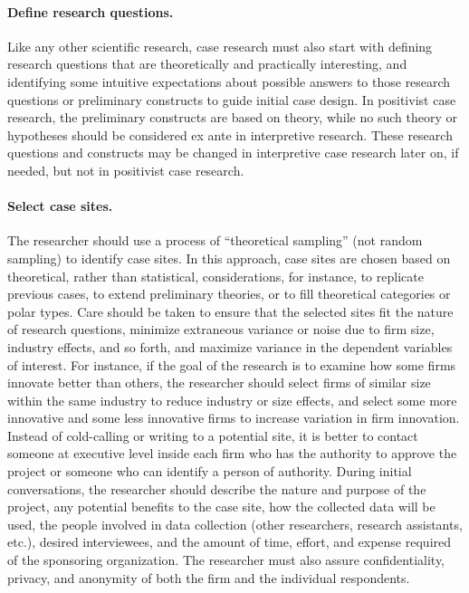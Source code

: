 \paragraph{Define research questions.} Like any other scientific research, case research must also start with defining research questions that are theoretically and practically interesting, and identifying some intuitive expectations about possible answers to those research questions or preliminary constructs to guide initial case design. In positivist case research, the preliminary constructs are based on theory, while no such theory or hypotheses should be considered ex ante in interpretive research. These research questions and constructs may be changed in interpretive case research later on, if needed, but not in positivist case research.

\paragraph{Select case sites.} The researcher should use a process of “theoretical sampling” (not random sampling) to identify case sites. In this approach, case sites are chosen based on theoretical, rather than statistical, considerations, for instance, to replicate previous cases, to extend preliminary theories, or to fill theoretical categories or polar types. Care should be taken to ensure that the selected sites fit the nature of research questions, minimize extraneous variance or noise due to firm size, industry effects, and so forth, and maximize variance in the dependent variables of interest. For instance, if the goal of the research is to examine how some firms innovate better than others, the researcher should select firms of similar size within the same industry to reduce industry or size effects, and select some more innovative and some less innovative firms to increase variation in firm innovation. Instead of cold-calling or writing to a potential site, it is better to contact someone at executive level inside each firm who has the authority to approve the project or someone who can identify a person of authority. During initial conversations, the researcher should describe the nature and purpose of the project, any potential benefits to the case site, how the collected data will be used, the people involved in data collection (other researchers, research assistants, etc.), desired interviewees, and the amount of time, effort, and expense required of the sponsoring organization. The researcher must also assure confidentiality, privacy, and anonymity of both the firm and the individual respondents.

